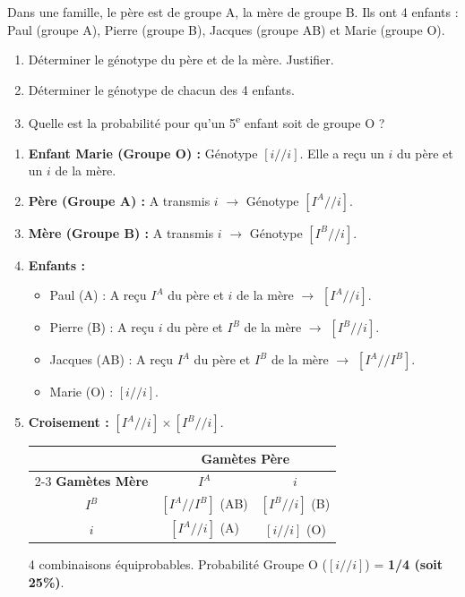 \documentclass[11pt]{article}
\begin{document}
\begin{exercice}
Dans une famille, le père est de groupe A, la mère de groupe B. Ils ont 4 enfants : Paul (groupe A), Pierre (groupe B), Jacques (groupe AB) et Marie (groupe O).
\begin{enumerate}
    \item Déterminer le génotype du père et de la mère. Justifier.
    \item Déterminer le génotype de chacun des 4 enfants.
    \item Quelle est la probabilité pour qu'un 5\textsuperscript{e} enfant soit de groupe O ?
\end{enumerate}
\end{exercice}

\begin{corrige}
\begin{enumerate}
    \item \textbf{Enfant Marie (Groupe O) :} Génotype $[i//i]$. Elle a reçu un $i$ du père et un $i$ de la mère.
    \item \textbf{Père (Groupe A) :} A transmis $i$ $\rightarrow$ Génotype $[I^A//i]$.
    \item \textbf{Mère (Groupe B) :} A transmis $i$ $\rightarrow$ Génotype $[I^B//i]$.
    \item \textbf{Enfants :}
        \begin{itemize}
            \item Paul (A) : A reçu $I^A$ du père et $i$ de la mère $\rightarrow$ $[I^A//i]$.
            \item Pierre (B) : A reçu $i$ du père et $I^B$ de la mère $\rightarrow$ $[I^B//i]$.
            \item Jacques (AB) : A reçu $I^A$ du père et $I^B$ de la mère $\rightarrow$ $[I^A//I^B]$.
            \item Marie (O) : $[i//i]$.
        \end{itemize}
    \item \textbf{Croisement :} $[I^A//i] \times [I^B//i]$.
        \begin{center}
        \begin{tabular}{|c|c|c|}\hline
        \multicolumn{1}{|c|}{} & \multicolumn{2}{c|}{\textbf{Gamètes Père}} \\ \cline{2-3}
        \textbf{Gamètes Mère} & $I^A$ & $i$ \\ \hline
        $I^B$ & $[I^A//I^B]$ (AB) & $[I^B//i]$ (B) \\ \hline
        $i$ & $[I^A//i]$ (A) & $[i//i]$ (O) \\ \hline
        \end{tabular}
        \end{center}
        4 combinaisons équiprobables. Probabilité Groupe O ($[i//i]$) = \textbf{1/4 (soit 25\%)}.
\end{enumerate}
\end{corrige}
\end{document}
